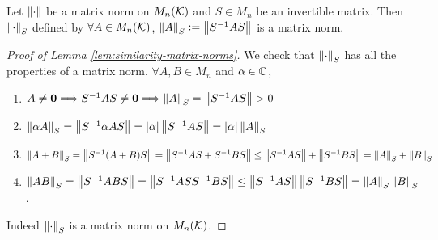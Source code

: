\begin{lemma}
\label{lem:similarity-matrix-norms}
Let $\left\lVert\cdot\right\rVert$ be a matrix norm on $M_n(\mathcal{K})$ and $S \in M_n$ be an invertible matrix. Then $\left\lVert\cdot\right\rVert_S$ defined by $\forall A \in M_n(\mathcal{K})$, $\left\lVert A\right\rVert_S \vcentcolon= \left\lVert S^{-1}AS\right\rVert$ is a matrix norm.
\end{lemma}
\begin{proof}[Proof of Lemma \ref{lem:similarity-matrix-norms}]
We check that $\left\lVert\cdot\right\rVert_S$ has all the properties of a matrix norm. $\forall A,B \in M_n$ and $\alpha \in \mathbb C$,
\begin{enumerate}
    \item $A \not= \mathbf{0} \Longrightarrow S^{-1}AS \not= \mathbf{0} \Longrightarrow \left\lVert A\right\rVert_S = \left\lVert S^{-1}AS\right\rVert > 0$
    \item $\left\lVert\alpha A\right\rVert_S = \left\lVert S^{-1}\alpha AS\right\rVert = |\alpha| \left\lVert S^{-1}AS\right\rVert = |\alpha|\left\lVert A\right\rVert_S$
    \item $\left\lVert A+B\right\rVert_S = \left\lVert S^{-1}(A+B)S\right\rVert = \left\lVert S^{-1}AS + S^{-1}BS\right\rVert \le \left\lVert S^{-1}AS\right\rVert + \left\lVert S^{-1}BS\right\rVert = \left\lVert A\right\rVert_S + \left\lVert B\right\rVert_S$
    \item $\left\lVert AB\right\rVert_S = \left\lVert S^{-1}ABS\right\rVert = \left\lVert S^{-1}ASS^{-1}BS\right\rVert \le \left\lVert S^{-1}AS\right\rVert\left\lVert S^{-1}BS\right\rVert = \left\lVert A\right\rVert_S\left\lVert B\right\rVert_S$.
\end{enumerate}
Indeed $\left\lVert\cdot\right\rVert_S$ is a matrix norm on $M_n(\mathcal{K})$.
\end{proof}

